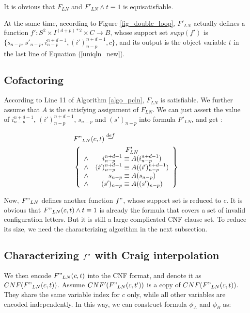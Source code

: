\documentclass{sig-alternate}
\begin{document}
It is obvious that $F_{LN}$ and $F'_{LN}\wedge t\equiv 1$ is equisatisfiable.

At the same time,
according to Figure \ref{fig_double_loop},
$F'_{LN}$ actually defines a function $f':S^{2}\times I^{(d+p)*2}\times C\to B$,
whose support set $supp(f')$ is $\{s_{n-p},s'_{n-p},i_{n-p}^{n+d-1},(i')_{n-p}^{n+d-1},c\}$,
and its output is the object variable $t$ in the last line of Equation (\ref{uniqln_new}).

\subsection{Cofactoring}
According to Line 11 of Algorithm \ref{algo_pcln},
$F_{LN}$ is satisfiable.
We further assume that $A$ is the satisfying assignment of $F_{LN}$.
We can just assert the value of $i_{n-p}^{n+d-1}$, $(i')_{n-p}^{n+d-1}$, $s_{n-p}$ and $(s')_{n-p}$ into formula $F'_{LN}$,
and get :

\begin{equation}\label{equ_char}
\begin{split}
&F"_{LN}(c,t)\stackrel{def}{=}\\
&\left\{
\begin{array}{cc}
& F'_{LN}\\
\wedge& i_{n-p}^{n+d-1}\equiv A(i_{n-p}^{n+d-1})\\
\wedge& (i')_{n-p}^{n+d-1}\equiv A((i')_{n-p}^{n+d-1})\\
\wedge& s_{n-p}\equiv A(s_{n-p})\\
\wedge& (s')_{n-p}\equiv A((s')_{n-p})
\end{array}
\right\}
\end{split}
\end{equation}

Now,
$F"_{LN}$ defines another function $f"$,
whose support set is reduced to $c$.
It is obvious that $F"_{LN}(c,t)\wedge t\equiv 1$ is already the formula that covers a set of invalid configuration letters.
But it is still a large complicated CNF clause set.
To reduce its size,
we need the characterizing algorithm in the next subsection.

\subsection{Characterizing $f"$ with Craig interpolation}

We then encode $F"_{LN}(c,t)$ into the CNF format,
and denote it as $CNF(F"_{LN}(c,t))$.
Assume $CNF'(F"_{LN}(c,t'))$ is a copy of $CNF(F"_{LN}(c,t))$.
They share the same variable index for $c$ only,
while all other variables are encoded independently.
In this way,
we can construct formula $\phi_A$ and $\phi_B$ as:
\end{document}
